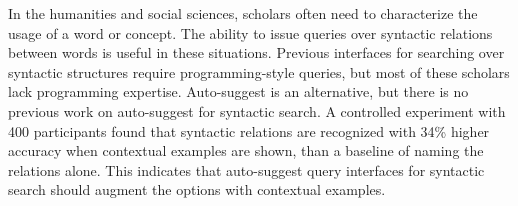 
In the humanities and social sciences, scholars often need to characterize the usage of a word or concept. The ability to issue queries over syntactic relations between words is useful in these situations.  Previous interfaces for  searching over syntactic structures require programming-style queries, but most of these scholars lack programming expertise. Auto-suggest is an alternative, but there is no previous work on auto-suggest for syntactic search. A controlled experiment with 400 participants found that syntactic relations are recognized with 34\% higher accuracy when contextual examples are shown, than a baseline of naming the relations alone.  This indicates that auto-suggest query interfaces for syntactic search should augment the options with contextual examples.
